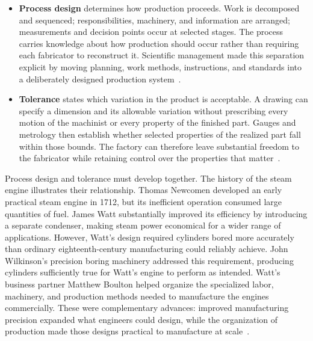 \begin{itemize}
\tightlist
\item
  \textbf{Process design} determines how production proceeds. Work is decomposed and sequenced; responsibilities, machinery, and information are arranged; measurements and decision points occur at selected stages. The process carries knowledge about how production should occur rather than requiring each fabricator to reconstruct it. Scientific management made this separation explicit by moving planning, work methods, instructions, and standards into a deliberately designed production system~\citep{taylor1911}.
\item
  \textbf{Tolerance} states which variation in the product is acceptable. A drawing can specify a dimension and its allowable variation without prescribing every motion of the machinist or every property of the finished part. Gauges and metrology then establish whether selected properties of the realized part fall within those bounds. The factory can therefore leave substantial freedom to the fabricator while retaining control over the properties that matter~\citep{winchester2018}.
\end{itemize}



Process design and tolerance must develop together. The history of the steam engine illustrates their relationship. Thomas Newcomen developed an early practical steam engine in 1712, but its inefficient operation consumed large quantities of fuel. James Watt substantially improved its efficiency by introducing a separate condenser, making steam power economical for a wider range of applications. However, Watt’s design required cylinders bored more accurately than ordinary eighteenth-century manufacturing could reliably achieve. John Wilkinson’s precision boring machinery addressed this requirement, producing cylinders sufficiently true for Watt’s engine to perform as intended. Watt’s business partner Matthew Boulton helped organize the specialized labor, machinery, and production methods needed to manufacture the engines commercially. These were complementary advances: improved manufacturing precision expanded what engineers could design, while the organization of production made those designs practical to manufacture at scale~\citep{robinson1969watt,winchester2018}.

